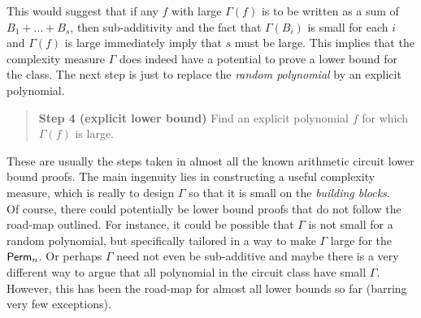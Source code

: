 This would suggest that if any $f$ with large $\Gamma(f)$ is to be written as a sum of $B_1 + \dots + B_s$, then sub-additivity and the fact that $\Gamma(B_i)$ is small for each $i$ and $\Gamma(f)$ is large immediately imply that $s$ must be large. 
This implies that the complexity measure $\Gamma$ does indeed have a potential to prove a lower bound for the class. 
The next step is just to replace the \emph{random polynomial} by an explicit polynomial. 

\begin{quote}
{\bf Step 4 (explicit lower bound)} Find an explicit polynomial $f$ for which $\Gamma(f)$ is large. 
\end{quote} 



These are usually the steps taken in almost all the known arithmetic circuit lower bound proofs. 
The main ingenuity lies in constructing a useful complexity measure, which is really to design $\Gamma$ so that it is small on the \emph{building blocks}. \\

Of course, there could potentially be lower bound proofs that do not follow the road-map outlined. 
For instance, it could be possible that $\Gamma$ is not small for a random polynomial, but specifically tailored in a way to make $\Gamma$ large for the $\operatorname{\mathsf{Perm}}_n$. 
Or perhaps $\Gamma$ need not even be sub-additive and maybe there is a very different way to argue that all polynomial in the circuit class have small $\Gamma$. 
However, this has been the road-map for almost all lower bounds so far (barring very few exceptions). 
